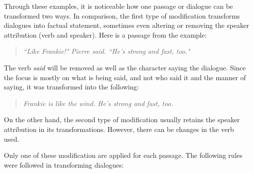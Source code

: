 Through these examples, it is noticeable how one passage or dialogue can be transformed two ways. In comparison, the first type of modification transforms dialogues into factual statement, sometimes even altering or removing the speaker attribution (verb and speaker). Here is a passage from the example:

\begin{verse}
\itshape
``Like Frankie!" Pierre said. ``He's strong and fast, too." \\
\end{verse}

The verb \textit{said} will be removed as well as the character saying the dialogue. Since the focus is mostly on what is being said, and not who said it and the manner of saying, it was transformed into the following:

\begin{verse}
\itshape
Frankie is like the wind. He's strong and fast, too. \\
\end{verse}

On the other hand, the second type of modification usually retains the speaker attribution in its transformations. However, there can be changes in the verb used.

Only one of these modification are applied for each passage. The following rules were followed in transforming dialogues:

